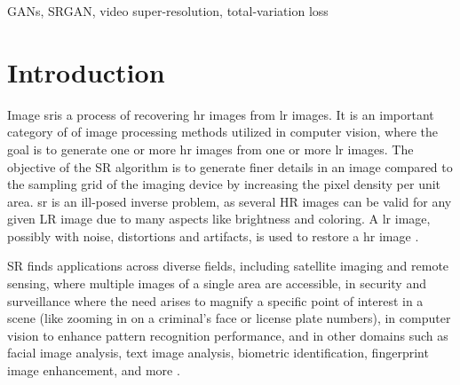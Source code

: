 \documentclass[conference]{IEEEtran}
\begin{document}
\begin{IEEEkeywords}
GANs, SRGAN, video super-resolution, total-variation loss
\end{IEEEkeywords}

\section{Introduction}
Image \acrfull{sr}is a process of recovering \acrfull{hr} images from \acrfull{lr} images. It is an important category of of image processing methods utilized in computer vision, where the goal is to generate one or more \acrshort{hr} images from one or more \acrshort{lr} images. The objective of the SR algorithm is to generate finer details in an image compared to the sampling grid of the imaging device by increasing the pixel density per unit area. \acrshort{sr} is an ill-posed inverse problem, as several HR images can be valid for any given LR image due to many aspects like brightness and coloring. A \acrshort{lr} image, possibly with noise, distortions and artifacts, is used to restore a \acrshort{hr} image \cite{Hitchhiker_guide_super_res_2023, sr_ill_posed_2021}.

SR finds applications across diverse fields, including satellite imaging and remote sensing, where multiple images of a single area are accessible, in security and surveillance where the need arises to magnify a specific point of interest in a scene (like zooming in on a criminal's face or license plate numbers), in computer vision to enhance pattern recognition performance, and in other domains such as facial image analysis, text image analysis, biometric identification, fingerprint image enhancement, and more \cite{sr_technical_overview_2003}.
\end{document}
